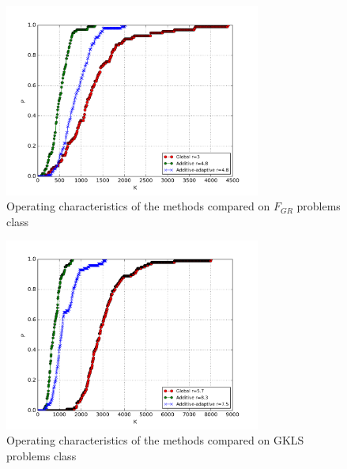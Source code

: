 \begin{figure}[ht]
  	\center
    \includegraphics[width=0.75\textwidth]{images/grishagin.png}
    \caption{Operating characteristics of the methods compared on \(F_{GR}\) problems class}
    \label{fig:grishh_op}
\end{figure}

\begin{figure}[ht]
  \center
  \includegraphics[width=0.75\textwidth]{images/gkls-s.png}
  \caption{Operating characteristics of the methods compared on GKLS problems class}
  \label{fig:gkls_op}
\end{figure}
